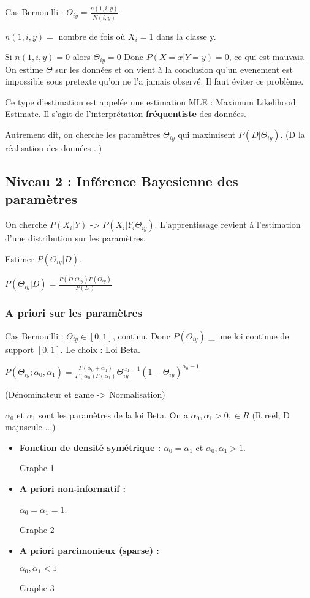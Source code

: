 \documentclass{article}
\begin{document}
Cas Bernouilli : $\Theta_{iy} = \frac{n(1, i, y)}{N(i, y)}$

$ n(1, i, y) =$ nombre de fois où $X_i = 1$ dans la classe y.

Si $n(1, i, y) = 0$ alors $\Theta_{iy} = 0$
Donc $P(X = x | Y = y) = 0$, ce qui est mauvais. On estime $\Theta$ sur les données et on vient à la conclusion qu'un evenement est impossible sous pretexte qu'on ne l'a jamais observé. Il faut éviter ce problème.

Ce type d'estimation est appelée une estimation MLE : Maximum Likelihood Estimate. Il s'agit de l'interprétation \textbf{fréquentiste} des données.

Autrement dit, on cherche les paramètres $\Theta_{iy}$ qui maximisent $P(D | \Theta_{iy})$. (D la réalisation des données ..)

\subsection{Niveau 2 : Inférence Bayesienne des paramètres}

On cherche $P(X_i | Y)$ -> $P(X_i | Y_i \Theta_{iy})$. L'apprentissage revient à l'estimation d'une distribution sur les paramètres.

Estimer $ P(\Theta_{iy} | D) $.

$ P(\Theta_{iy} | D) = \frac{P(D | \Theta_{iy})P(\Theta_{iy})}{P(D)} $

\subsubsection{A priori sur les paramètres}

Cas Bernouilli : $\Theta_{iy} \in [0, 1]$, continu. Donc $P(\Theta_{iy})$ \_ une loi continue de support $[0, 1]$.
Le choix : Loi Beta.

$P(\Theta_{iy}; \alpha_0, \alpha_1) = \frac{\Gamma (\alpha_0 + \alpha_1)}{\Gamma (\alpha_0) \Gamma (\alpha_1)} \Theta_{iy}^{\alpha_1 - 1} (1 - \Theta_{iy})^{\alpha_0 - 1}  $

(Dénominateur et game -> Normalisation)

$\alpha_0$ et $\alpha_1$ sont les paramètres de la loi Beta. On a $\alpha_0, \alpha_1 > 0, \in R$ (R reel, D majuscule ...)

\begin{itemize}
\item \textbf{Fonction de densité symétrique : }
$\alpha_0 = \alpha_1$ et $\alpha_0, \alpha_1 > 1$.

Graphe 1

\item \textbf{A priori non-informatif : }

$\alpha_0 = \alpha_1 = 1$.

Graphe 2

\item \textbf{A priori parcimonieux (sparse) : }

$\alpha_0, \alpha_1 < 1$

Graphe 3

\end{itemize}
\end{document}
